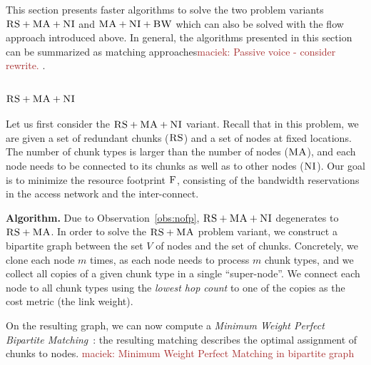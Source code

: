 \documentclass[9pt]{sigcomm-alternate}
\newcommand{\maciek}[1]{\textcolor{brown}{maciek: #1}}
\newcommand{\MaFactor}{m}
\newcommand{\ChunkType}{\tau}
\newcommand{\VirtualNodes}{\ensuremath{V}}
\newcommand{\CC}{\textsc{NI}}
\newcommand{\RS}{\textsc{RS}}
\newcommand{\BW}{\textsc{BW}}
\newcommand{\MA}{\textsc{MA}}
\newcommand{\Cost}{\textsc{F}}
\begin{document}
This section presents faster algorithms to solve the two problem variants
$\RS+\MA+\CC$ and $\MA+\CC+\BW$ which can also be solved with the flow approach
introduced above.
In general, the algorithms presented in this section can be summarized
as matching approaches\maciek{Passive voice - consider rewrite.}
.

\subsubsection{$\RS+\MA+\CC$}

Let us first consider the $\RS+\MA+\CC$ variant.
Recall that in this problem,
we are given a set of redundant chunks ($\RS$) and a set of nodes
at fixed locations. The number of chunk types is larger than the number
of nodes ($\MA$), and each node needs to be connected
to its chunks as well as to other nodes ($\CC$).
Our goal is to minimize the resource footprint $\Cost$, consisting
of the bandwidth reservations in the access network and the inter-connect.

\textbf{Algorithm.} Due to Observation~\ref{obs:nofp}, $\RS+\MA+\CC$ degenerates to $\RS+\MA$.
In order to solve the $\RS+\MA$ problem variant,
we construct a bipartite
graph between the set
$\VirtualNodes$ of nodes and
the set of chunks.
Concretely, we clone each node $\MaFactor$ times,
as each node needs to process
$\MaFactor$ chunk types, and we collect all copies of a given chunk type in a
single %
``super-node''. We connect each node to all chunk types using the
\emph{lowest hop count} to one of the copies as the cost metric (the link weight).

On the resulting graph, we can now compute a \emph{Minimum Weight
Perfect Bipartite
Matching}~\cite{gabow_scaling_algorithm}:
the resulting matching describes the optimal assignment of chunks to nodes. \maciek{Minimum Weight Perfect Matching in bipartite graph}

\end{document}
